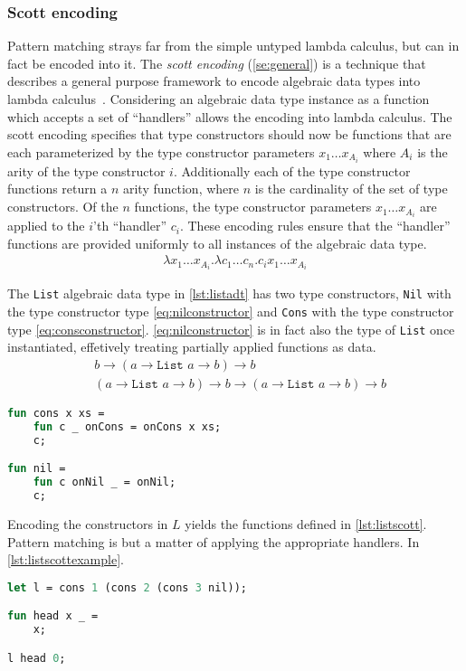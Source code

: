 \documentclass[11pt,oneside,a4paper]{report}
\begin{document}
\subsubsection{Scott encoding}
Pattern matching strays far from the simple untyped lambda calculus, but can in fact be encoded into it.
The \textit{scott encoding} (\autoref{se:general}) is a technique that describes a general purpose framework to encode algebraic data types into lambda calculus~\cite{scott1962system}.
Considering an algebraic data type instance as a function which accepts a set of ``handlers'' allows the encoding into lambda calculus.
The scott encoding specifies that type constructors should now be functions that are each parameterized by the type constructor parameters $x_1 \dots x_{A_i}$ where $A_i$ is the arity of the type constructor $i$.
Additionally each of the type constructor functions return a $n$ arity function, where $n$ is the cardinality of the set of type constructors.
Of the $n$ functions, the type constructor parameters $x_1 \dots x_{A_i}$ are applied to the $i$'th ``handler'' $c_i$.
These encoding rules ensure that the ``handler'' functions are provided uniformly to all instances of the algebraic data type.
\begin{align}
    \lambda x_1 \dots x_{A_i}. \lambda c_1 \dots c_n. c_i x_1 \dots x_{A_i}
\label{se:general}
\end{align}
\begin{exmp}
    The \texttt{List} algebraic data type in \autoref{lst:listadt} has two type constructors, \texttt{Nil} with the type constructor type \autoref{eq:nilconstructor} and \texttt{Cons} with the type constructor type \autoref{eq:consconstructor}.
    \autoref{eq:nilconstructor} is in fact also the type of \texttt{List} once instantiated, effetively treating partially applied functions as data.
\begin{align}
   &b \rightarrow (a \rightarrow \texttt{List } a \rightarrow b) \rightarrow b
   \label{eq:nilconstructor}\\
   &(a \rightarrow \texttt{List } a \rightarrow b) \rightarrow b \rightarrow (a \rightarrow \texttt{List } a \rightarrow b) \rightarrow b
   \label{eq:consconstructor}
\end{align}
\begin{lstlisting}[language=ML,caption={List algebraic data type implementation},label={lst:listscott}]
fun cons x xs = 
    fun c _ onCons = onCons x xs;
    c;

fun nil = 
    fun c onNil _ = onNil;
    c;
\end{lstlisting}
Encoding the constructors in $L$ yields the functions defined in \autoref{lst:listscott}.
Pattern matching is but a matter of applying the appropriate handlers.
In \autoref{lst:listscottexample}.
\begin{lstlisting}[language=ML,caption={Example of scott encoded list algebraic data type},label={lst:listscottexample}]
let l = cons 1 (cons 2 (cons 3 nil));

fun head x _ = 
    x;

l head 0;
\end{lstlisting}
\end{exmp}
\end{document}
